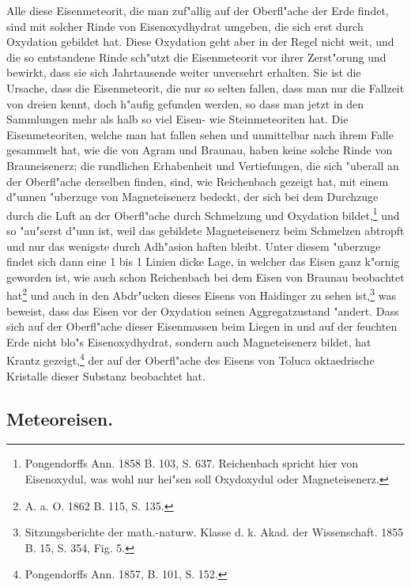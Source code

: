 \documentclass[a4paper, 11pt, oneside, german]{article}
\begin{document}
Alle diese Eisenmeteorit, die man zuf"allig auf der Oberfl"ache der Erde findet, sind mit solcher Rinde von Eisenoxydhydrat umgeben, die sich erst durch Oxydation gebildet hat. Diese Oxydation geht aber in der Regel nicht weit, und die so entstandene Rinde sch"utzt die Eisenmeteorit vor ihrer Zerst"orung und bewirkt, dass sie sich Jahrtausende weiter unversehrt erhalten. Sie ist die Ursache, dass die Eisenmeteorit, die nur so selten fallen, dass man nur die Fallzeit von dreien kennt, doch h"aufig gefunden werden, so dass man jetzt in den Sammlungen mehr als halb so viel Eisen- wie Steinmeteoriten hat. Die Eisenmeteoriten, welche man hat fallen sehen und unmittelbar nach ihrem Falle gesammelt hat, wie die von Agram und Braunau, haben keine solche Rinde von Brauneisenerz; die rundlichen Erhabenheit und Vertiefungen, die sich "uberall an der Oberfl"ache derselben finden, sind, wie Reichenbach gezeigt hat, mit einem d"unnen "uberzuge von Magneteisenerz bedeckt, der sich bei dem Durchzuge durch die Luft an der Oberfl"ache durch Schmelzung und Oxydation bildet,\footnote{Pongendorffs Ann. 1858 B. 103, S. 637. Reichenbach spricht hier von Eisenoxydul, was wohl nur hei"sen soll Oxydoxydul oder Magneteisenerz.} und so "au"serst d"unn ist, weil das gebildete Magneteisenerz beim Schmelzen abtropft und nur das wenigste durch Adh"asion haften bleibt. Unter diesem "uberzuge findet sich dann eine 1 bis 1 Linien dicke Lage, in welcher das Eisen ganz k"ornig geworden ist, wie auch schon Reichenbach bei dem Eisen von Braunau beobachtet hat\footnote{A. a. O. 1862 B. 115, S. 135.} und auch in den Abdr"ucken dieses Eisens von Haidinger zu sehen ist,\footnote{Sitzungsberichte der math.-naturw. Klasse d. k. Akad. der Wissenschaft. 1855 B. 15, S. 354, Fig. 5.} was beweist, dass das Eisen vor der Oxydation seinen Aggregatzustand "andert. Dass sich auf der Oberfl"ache dieser Eisenmassen beim Liegen in und auf der feuchten Erde nicht blo"s Eisenoxydhydrat, sondern auch Magneteisenerz bildet, hat Krantz gezeigt,\footnote{Pongendorffs Ann. 1857, B. 101, S. 152.} der auf der Oberfl"ache des Eisens von Toluca oktaedrische Kristalle dieser Substanz beobachtet hat.
\subsection{Meteoreisen.}
\end{document}
